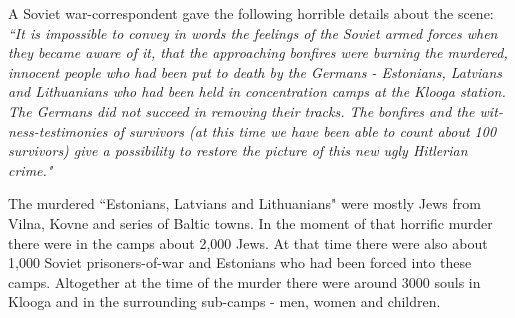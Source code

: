 \documentclass{article}
\begin{document}
\begin{pairs}
\begin{Leftside}
\begin{english}
A Soviet war-correspondent gave the following horrible details about the scene:
\emph{``It is impossible to convey in words the feelings of the Soviet armed forces when they
became aware of it, that the approaching bonfires were burning the murdered, innocent people who
had been put to death by the Germans - Estonians, Latvians and Lithuanians who had been held in
concentration camps at the Klooga station. The Germans did not succeed in removing their tracks.
The bonfires and the witness-testimonies of survivors 
(at this time we have been able to count about 100 survivors) give a possibility to restore the picture
of this new ugly Hitlerian crime."}

The murdered ``Estonians, Latvians and Lithuanians" were mostly Jews from Vilna, Kovne and series
of Baltic towns. In the moment of that horrific murder there were in the camps about 2,000 Jews.
At that time there were also about 1,000 Soviet prisoners-of-war and Estonians who had been forced
into these camps. Altogether at the time of the murder there were around 3000 souls in Klooga and in the 
surrounding sub-camps - men, women and children.

\endnumbering
\end{english}
\end{Leftside}

\end{pairs}
\Columns
\end{document}
